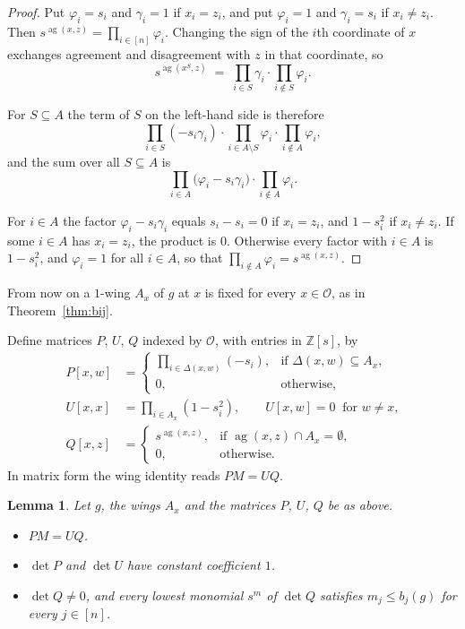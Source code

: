 \documentclass[11pt,reqno]{amsart}
\newtheorem{lemma}[theorem]{Lemma}
\theoremstyle{definition}
\theoremstyle{remark}
\numberwithin{equation}{section}
\theoremstyle{named}
\theoremstyle{plain}
\newcommand{\Z}{\mathbb{Z}}
\newcommand{\ag}{\operatorname{ag}}
\newcommand{\cO}{\mathcal{O}}
\begin{document}
\begin{proof}
Put $\varphi_i=s_i$ and $\gamma_i=1$ if $x_i=z_i$, and put $\varphi_i=1$ and $\gamma_i=s_i$ if
$x_i\ne z_i$. Then $s^{\ag(x,z)}=\prod_{i\in[n]}\varphi_i$. Changing the sign of the $i$th coordinate
of $x$ exchanges agreement and disagreement with $z$ in that coordinate, so
\[
   s^{\ag(x^{S},z)}\;=\;\prod_{i\in S}\gamma_i\cdot\prod_{i\notin S}\varphi_i .
\]

For $S\subseteq A$ the term
of $S$ on the left-hand side is therefore
\[
   \prod_{i\in S}(-s_i\gamma_i)\cdot\prod_{i\in A\setminus S}\varphi_i\cdot\prod_{i\notin A}\varphi_i ,
\]
and the sum over all $S\subseteq A$ is
\[
   \prod_{i\in A}\bigl(\varphi_i-s_i\gamma_i\bigr)\cdot\prod_{i\notin A}\varphi_i .
\]

For $i\in A$ the factor $\varphi_i-s_i\gamma_i$ equals $s_i-s_i=0$ if $x_i=z_i$, and $1-s_i^{2}$ if
$x_i\ne z_i$. If some $i\in A$ has $x_i=z_i$, the product is $0$. Otherwise every factor with
$i\in A$ is $1-s_i^{2}$, and $\varphi_i=1$ for all $i\in A$, so that
$\prod_{i\notin A}\varphi_i=s^{\ag(x,z)}$.
\end{proof}

From now on a $1$-wing $A_x$ of $g$ at $x$ is fixed for every $x\in\cO$, as in
Theorem~\ref{thm:bij}.

Define matrices $P$, $U$, $Q$ indexed by $\cO$, with entries in $\Z[s]$, by
\begin{align*}
  P[x,w]&=\begin{cases}\prod_{i\in\Delta(x,w)}(-s_i),&\text{if }\Delta(x,w)\subseteq A_x,\\
                       0,&\text{otherwise,}\end{cases}\\[2pt]
  U[x,x]&=\prod_{i\in A_x}(1-s_i^{2}),\qquad U[x,w]=0\ \text{ for }w\ne x,\\[2pt]
  Q[x,z]&=\begin{cases}s^{\ag(x,z)},&\text{if }\ag(x,z)\cap A_x=\emptyset,\\
                        0,&\text{otherwise.}\end{cases}
\end{align*}
In matrix form the wing identity reads $PM=UQ$.

\begin{lemma}\label{lem:PMUQ}
Let $g$, the wings $A_x$ and the matrices $P$, $U$, $Q$ be as above.
\begin{itemize}
\item[\textup{(i)}] $PM=UQ$.
\item[\textup{(ii)}] $\det P$ and $\det U$ have constant coefficient $1$.
\item[\textup{(iii)}] $\det Q\ne0$, and every lowest monomial $s^{m}$ of $\det Q$ satisfies
$m_j\le b_j(g)$ for every $j\in[n]$.
\end{itemize}
\end{lemma}
\end{document}
